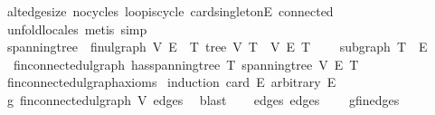 \begin{isabellebody}
\ alt{\isacharunderscore}{\kern0pt}edge{\isacharunderscore}{\kern0pt}size\ no{\isacharunderscore}{\kern0pt}cycles\ loop{\isacharunderscore}{\kern0pt}is{\isacharunderscore}{\kern0pt}cycle{}\ card{\isacharunderscore}{\kern0pt}{}{\isacharunderscore}{\kern0pt}singletonE\ connected\isanewline
\ \ \isamarkupfalse%
\ {\isacharparenleft}{\kern0pt}unfold{\isacharunderscore}{\kern0pt}locales{\isacharcomma}{\kern0pt}\ metis{\isacharcomma}{\kern0pt}\ simp{\isacharparenright}{\kern0pt}%
\endisatagproof
{\isafoldproof}%
%
\isadelimproof
\isanewline
%
\endisadelimproof
\isanewline
{}\isamarkupfalse%
\isanewline
\isanewline
{}\isamarkupfalse%
\ spanning{\isacharunderscore}{\kern0pt}tree\ {\isacharequal}{\kern0pt}\ fin{\isacharunderscore}{\kern0pt}ulgraph\ V\ E\ {\isacharplus}{\kern0pt}\ T{\isacharcolon}{\kern0pt}\ tree\ V\ T\ \ V\ E\ T\ {\isacharplus}{\kern0pt}\isanewline
\ \ \ subgraph{\isacharcolon}{\kern0pt}\ {\isachardoublequoteopen}T\ {\isasymsubseteq}\ E{\isachardoublequoteclose}\isanewline
\isanewline
{}\isamarkupfalse%
\ {\isacharparenleft}{\kern0pt}\ fin{\isacharunderscore}{\kern0pt}connected{\isacharunderscore}{\kern0pt}ulgraph{\isacharparenright}{\kern0pt}\ has{\isacharunderscore}{\kern0pt}spanning{\isacharunderscore}{\kern0pt}tree{\isacharcolon}{\kern0pt}\ {\isachardoublequoteopen}{\isasymexists}T{\isachardot}{\kern0pt}\ spanning{\isacharunderscore}{\kern0pt}tree\ V\ E\ T{\isachardoublequoteclose}\isanewline
%
\isadelimproof
\ \ %
\endisadelimproof
%
\isatagproof
{}\isamarkupfalse%
\ fin{\isacharunderscore}{\kern0pt}connected{\isacharunderscore}{\kern0pt}ulgraph{\isacharunderscore}{\kern0pt}axioms\isanewline
{}\isamarkupfalse%
\ {\isacharparenleft}{\kern0pt}induction\ {\isachardoublequoteopen}card\ E{\isachardoublequoteclose}\ arbitrary{\isacharcolon}{\kern0pt}\ E{\isacharparenright}{\kern0pt}\isanewline
\ \ \isamarkupfalse%
\ {}\isanewline
\ \ \isamarkupfalse%
\ \isamarkupfalse%
\ g{\isacharcolon}{\kern0pt}\ fin{\isacharunderscore}{\kern0pt}connected{\isacharunderscore}{\kern0pt}ulgraph\ V\ edges\ \isamarkupfalse%
\ blast\isanewline
\ \ \isamarkupfalse%
\ edges{\isacharcolon}{\kern0pt}\ {\isachardoublequoteopen}edges\ {\isacharequal}{\kern0pt}\ {\isacharbraceleft}{\kern0pt}{\isacharbraceright}{\kern0pt}{\isachardoublequoteclose}\ \isamarkupfalse%
\ g{\isachardot}{\kern0pt}fin{\isacharunderscore}{\kern0pt}edges\ {}\ \isamarkupfalse%

\end{isabellebody}
